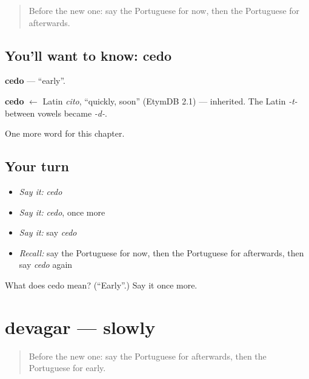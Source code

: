 \label{lesson:PT-C71-cedo}



\begin{quote}
Before the new one: say the Portuguese for now, then the Portuguese for afterwards.
\end{quote}

\subsection*{You'll want to know: cedo}
\textbf{cedo} — \textquotedblleft{}early\textquotedblright{}.

\begin{cousinweb}
\textbf{cedo} $\leftarrow$ Latin \emph{cito}, \textquotedblleft{}quickly, soon\textquotedblright{} (EtymDB 2.1) — inherited. The Latin \emph{-t-} between vowels became \emph{-d-}.
\end{cousinweb}

\begin{grammarlens}[title={What you've built}]
One more word for this chapter.
\end{grammarlens}

\subsection*{Your turn}
\begin{itemize}
\raggedright
  \item \emph{Say it:} \emph{cedo}
  \item \emph{Say it:} \emph{cedo}, once more
  \item \emph{Say it:} say \emph{cedo}
  \item \emph{Recall:} say the Portuguese for now, then the Portuguese for afterwards, then say \emph{cedo} again
\end{itemize}

\begin{tcolorbox}[breakable,colback=teal!4,colframe=teal!35!black,title={Before you move on}]
What does cedo mean? (\textquotedblleft{}Early\textquotedblright{}.) Say it once more.
\end{tcolorbox}
\section[devagar]{devagar — slowly}

\label{lesson:PT-C71-devagar}



\begin{quote}
Before the new one: say the Portuguese for afterwards, then the Portuguese for early.
\end{quote}

